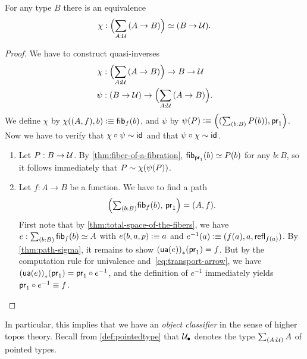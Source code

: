 \begin{thm}\label{thm:nobject-classifier-appetizer}
For any type $B$ there is an equivalence
\begin{equation*}
\chi:\Parens{\sm{A:\type} (A\to B)}\eqvsym (B\to\type).
\end{equation*}
\end{thm}
\begin{proof}
We have to construct quasi-inverses
\begin{align*}
\chi & : \Parens{\sm{A:\type} (A\to B)}\to B\to\type\\
\psi & : (B\to\type)\to\Parens{\sm{A:\type} (A\to B)}.
\end{align*}
We define $\chi$ by $\chi((A,f),b)\vcentcolon\equiv{\mathsf{fib}}_{f}(b)$, and $\psi$ by $\psi(P)\defeq\Pairr{(\sm{b:B} P(b)),\proj1}$.
Now we have to verify that $\chi\circ\psi\sim\mathsf{id}_{}{}$ and that $\psi\circ\chi \sim\mathsf{id}_{}{}$.
\begin{enumerate}
\item Let $P:B\to\mathcal{U}$.
  By \cref{thm:fiber-of-a-fibration},
${\mathsf{fib}}_{\mathsf{pr}_{1}}(b)\simeq P(b)$ for any $b:B$, so it follows immediately
that $P\sim\chi(\psi(P))$.
\item Let $f:A\to B$ be a function. We have to find a path
\begin{equation*}
\Pairr{\tsm{b:B} \hfiber{f}b,\,\proj1}=\pairr{A,f}.
\end{equation*}
First note that by \cref{thm:total-space-of-the-fibers}, we have
$e:\sm{b:B} \hfiber{f}b\eqvsym A$ with $e(b,a,p)\vcentcolon\equiv a$ and $e^{-1}(a)
\vcentcolon\equiv(f(a),a,\mathsf{refl}_{f(a)})$.
By \cref{thm:path-sigma}, it remains to show ${(\mathsf{ua}(e))}_{*}\mathopen{}\left({\mathsf{pr}_{1}}\right)\mathclose{} = f$.
But by the computation rule for univalence and~\eqref{eq:transport-arrow}, we have ${(\mathsf{ua}(e))}_{*}\mathopen{}\left({\mathsf{pr}_{1}}\right)\mathclose{} = \mathsf{pr}_{1}\circ e^{-1}$, and the definition of $e^{-1}$ immediately yields $\mathsf{pr}_{1} \circ e^{-1} \equiv f$.\qedhere
\end{enumerate}
\end{proof}

\noindent
{}%
%
%
In particular, this implies that we have an \emph{object classifier} in the sense of higher topos theory.
Recall from \cref{def:pointedtype} that $\mathcal{U}_\bullet$ denotes the type $\sm{A:\type} A$ of pointed types.


